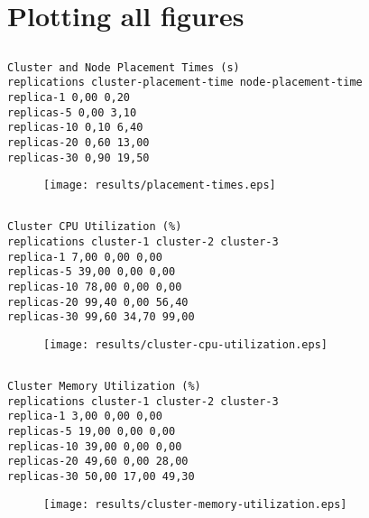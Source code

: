 \documentclass{elsart}
\begin{document}
\section{Plotting all figures}
\subsection{}

\begin{lstlisting}[caption={}]
Cluster and Node Placement Times (s)
replications cluster-placement-time node-placement-time
replica-1 0,00 0,20
replicas-5 0,00 3,10
replicas-10 0,10 6,40
replicas-20 0,60 13,00
replicas-30 0,90 19,50
\end{lstlisting}

\begin{figure}[ht]
\centering
\texttt{[image: results/placement-times.eps]}
\caption{}\label{fig:placement-times.eps}
\end{figure}

\subsection{}

\begin{lstlisting}[caption={}]
Cluster CPU Utilization (%)
replications cluster-1 cluster-2 cluster-3
replica-1 7,00 0,00 0,00
replicas-5 39,00 0,00 0,00
replicas-10 78,00 0,00 0,00
replicas-20 99,40 0,00 56,40
replicas-30 99,60 34,70 99,00
\end{lstlisting}

\begin{figure}[ht]
\centering
\texttt{[image: results/cluster-cpu-utilization.eps]}
\caption{}\label{fig:cluster-cpu-utilization.eps}
\end{figure}

\subsection{}

\begin{lstlisting}[caption={}]
Cluster Memory Utilization (%)
replications cluster-1 cluster-2 cluster-3
replica-1 3,00 0,00 0,00
replicas-5 19,00 0,00 0,00
replicas-10 39,00 0,00 0,00
replicas-20 49,60 0,00 28,00
replicas-30 50,00 17,00 49,30
\end{lstlisting}

\begin{figure}[ht]
\centering
\texttt{[image: results/cluster-memory-utilization.eps]}
\caption{}\label{fig:cluster-memory-utilization.eps}
\end{figure}
\end{document}
